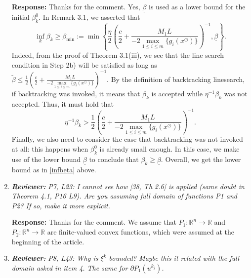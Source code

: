 \documentclass{article}
\def\R{\mathbb{R}}
\begin{document}
\begin{enumerate}
	\textbf{Response:} Thanks for the comment. Yes, $\underline{\beta}$ is used as a lower bound for the initial $\beta_k^0$. In Remark 3.1, we asserted that
\begin{equation}\label{infbeta}
\inf_k \beta_k \ge \beta_{\min}:= \textstyle\min\left\{\frac{\eta}{2}\left(\frac{c}2 + \frac{M_1L}{-2\max\limits_{1 \le i \le m}\{g_i(x^\odot)\}}\right)^{-1},\underline{\beta}\right\}.
\end{equation}
Indeed, from the proof of Theorem 3.1(iii), we see that the line search condition in Step 2b) will be satisfied as long as $\widetilde \beta \le \frac{1}{2}\left(\frac{c}2 + \frac{M_1L}{-2\max\limits_{1 \le i \le m}\{g_i(x^\odot)\}}\right)^{-1}$. By the definition of backtracking linesearch, if backtracking was invoked, it means that $\beta_k$ is accepted while $\eta^{-1}\beta_k$ was not accepted. Thus, it must hold that
\[
\eta^{-1}\beta_k > \frac{1}{2}\left(\frac{c}2 + \frac{M_1L}{-2\max\limits_{1 \le i \le m}\{g_i(x^\odot)\}}\right)^{-1}.
\]
Finally, we also need to consider the case that backtracking was not invoked at all: this happens when $\beta^0_k$ is already small enough. In this case, we make use of the lower bound $\underline{\beta}$ to conclude that $\beta_k \ge \underline{\beta}$. Overall, we get the lower bound as in \eqref{infbeta} above.
%

	\item  \textit{\textbf{Reviewer:}} \textit{P7, L23: I cannot see how [38, Th 2.6] is applied (same doubt in Theorem 4.1, P16 L9). Are you assuming full domain of functions P1 and P2? If so, make it more explicit.}
	
	\textbf{Response:} Thanks for the comment. We assume that $P_1:\R^n\rightarrow\R$ and $P_2:\R^n\rightarrow\R$ are finite-valued convex functions, which were assumed at the beginning of the article.

	\item  \textit{\textbf{Reviewer:}} \textit{P8, L43: Why is $\xi^k$ bounded? Maybe this it related with the full domain asked in item 4. The same for $\partial P_1(u^{k_j})$.}
	

\end{enumerate}
\end{document}
